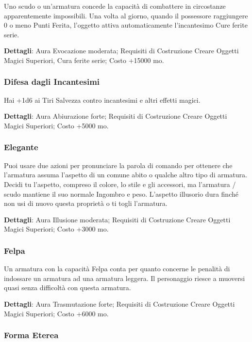 \begin{multicols}{2}
	Uno scudo o un'armatura concede la capacità di combattere in circostanze apparentemente impossibili. Una volta al giorno, quando il possessore raggiungere 0 o meno Punti Ferita, l'oggetto attiva automaticamente l'incantesimo Cure ferite serie.

	\textbf{Dettagli}: Aura Evocazione moderata; Requisiti di Costruzione Creare Oggetti Magici Superiori, Cura ferite serie; Costo +15000 mo.

	\subsubsection*{Difesa dagli Incantesimi}

	Hai +1d6 ai Tiri Salvezza contro incantesimi e altri effetti magici.

	\textbf{Dettagli}: Aura Abiurazione forte; Requisiti di Costruzione Creare Oggetti Magici Superiori; Costo +5000 mo.

	\subsubsection*{Elegante}

	Puoi usare due azioni per pronunciare la parola di comando per ottenere che l'armatura assuma l'aspetto di un comune abito o qualche altro tipo di armatura. Decidi tu l'aspetto, compreso il colore, lo stile e gli accessori, ma l'armatura / scudo mantiene il suo normale Ingombro e peso. L'aspetto illusorio dura finché non usi di nuovo questa proprietà o ti togli l'armatura.

	\textbf{Dettagli}: Aura Illusione moderata; Requisiti di Costruzione Creare Oggetti Magici Superiori; Costo +3000 mo.


	\subsubsection*{Felpa}

	Un armatura con la capacità Felpa conta per quanto concerne le penalità di indossare un armatura ad una armatura leggera. Il personaggio riesce a muoversi quasi senza difficoltà con questa armatura.

	\textbf{Dettagli}: Aura Trasmutazione forte; Requisiti di Costruzione Creare Oggetti Magici Superiori; Costo +6000 mo.

	\subsubsection*{Forma Eterea}


\end{multicols}
